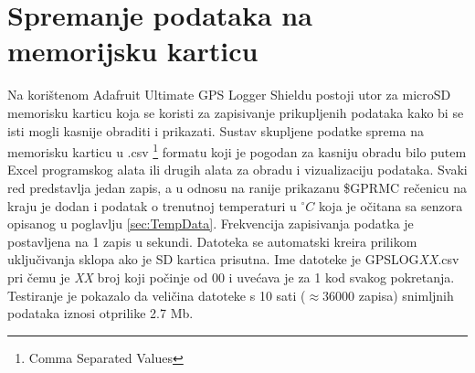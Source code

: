 \section{Spremanje podataka na memorijsku karticu}
Na korištenom Adafruit Ultimate GPS Logger Shieldu postoji utor za microSD memorisku karticu koja se koristi za zapisivanje prikupljenih podataka kako bi se isti mogli kasnije obraditi i prikazati.
Sustav skupljene podatke sprema na memorisku karticu u .csv \footnote{Comma Separated Values} formatu koji je pogodan za kasniju obradu bilo putem Excel programskog alata ili drugih alata za obradu i vizualizaciju podataka.
Svaki red predstavlja jedan zapis, a u odnosu na ranije prikazanu \$GPRMC rečenicu na kraju je dodan i podatak o trenutnoj temperaturi u $^\circ C$ koja je očitana sa senzora opisanog u poglavlju \ref{sec:TempData}.
Frekvencija zapisivanja podatka je postavljena na 1 zapis u sekundi.
Datoteka se automatski kreira prilikom uključivanja sklopa ako je SD kartica prisutna.
Ime datoteke je GPSLOG\textit{XX}.csv pri čemu je \textit{XX} broj koji počinje od 00 i uvećava je za 1 kod svakog pokretanja. 
Testiranje je pokazalo da veličina datoteke s 10 sati ($\approx 36000$ zapisa) snimljnih podataka iznosi otprilike 2.7 Mb.

